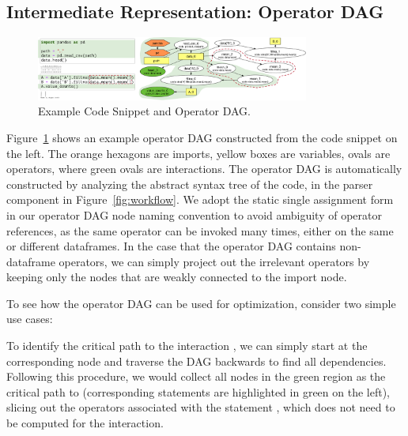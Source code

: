 \subsection{Intermediate Representation: Operator DAG}
\label{sec:dag}
\begin{figure}
    \centering
    \includegraphics[width=0.8\textwidth]{submissions/interactivity/figures/dag.pdf}
    \caption{Example Code Snippet and Operator DAG.}
    \label{fig:op_dag}
    \vspace{-5mm}
\end{figure}

Figure~\ref{fig:op_dag} shows an example operator DAG constructed from the code snippet on the left. The orange hexagons are imports, yellow boxes are variables, ovals are operators, where green ovals are interactions. The operator DAG is automatically constructed by analyzing the abstract syntax tree of the code, in the parser component in Figure~\ref{fig:workflow}. We adopt the static single assignment form in our operator DAG node naming convention to avoid ambiguity of operator references, as the same operator can be invoked many times, either on the same or different dataframes. 
In the case that the operator DAG contains non-dataframe operators, we can simply project out the irrelevant operators by keeping only the nodes that are weakly connected to the  import node. 

To see how the operator DAG can be used for optimization, consider two simple use cases:

 To identify the critical path to the interaction , we can simply start at the corresponding node and traverse the DAG backwards to find all dependencies. Following this procedure, we would collect all nodes in the green region as the critical path to  (corresponding statements are highlighted in green on the left), slicing out the operators associated with the statement , which does not need to be computed for the interaction. 

